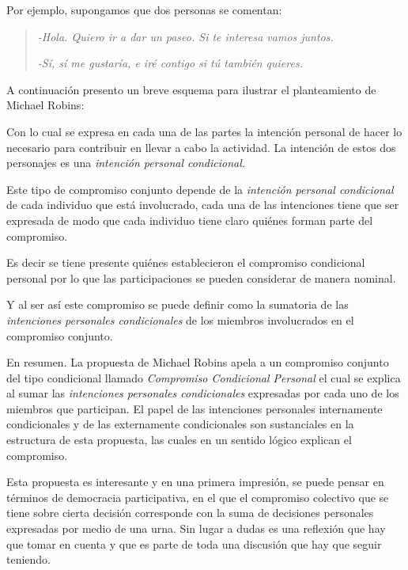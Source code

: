 \documentclass[oneside]{book}
\begin{document}
Por ejemplo, supongamos que dos personas se comentan: 
\begin{quote}

	\textit{-Hola. Quiero ir a dar un paseo. Si te interesa vamos juntos.}

	\textit{-Sí, sí me gustaría, e iré contigo si tú también quieres.}
\end{quote}

A continuación presento un breve esquema para ilustrar el planteamiento de Michael Robins:



Con lo cual se expresa en cada una de las partes la intención personal de hacer lo necesario para contribuir en llevar a cabo la actividad. La intención de estos dos personajes es una \textit{intención personal condicional.}

Este tipo de compromiso conjunto depende de la \textit{intención personal condicional} de cada individuo que está involucrado, cada una de las intenciones tiene que ser expresada de modo que cada individuo tiene claro quiénes forman parte del compromiso.

Es decir se tiene presente quiénes establecieron el compromiso condicional personal por lo que las participaciones se pueden considerar de manera nominal.

Y al ser así este compromiso se puede definir como la sumatoria de las \textit{intenciones personales condicionales} de los miembros involucrados en el compromiso conjunto.

En resumen. La propuesta de Michael Robins apela a un compromiso conjunto del tipo condicional llamado \textit{Compromiso Condicional Personal} el cual se explica al sumar las \textit{intenciones personales condicionales} expresadas por cada uno de los miembros que participan. El papel de las intenciones personales internamente condicionales y de las externamente condicionales son sustanciales en la estructura de esta propuesta, las cuales en un sentido lógico explican el compromiso.

Esta propuesta es interesante y en una primera impresión, se puede pensar en términos de democracia participativa, en el que el compromiso colectivo que se tiene sobre cierta decisión corresponde con la suma de decisiones personales expresadas por medio de una urna. Sin lugar a dudas es una reflexión que hay que tomar en cuenta y que es parte de toda una discusión que hay que seguir teniendo.
\end{document}
